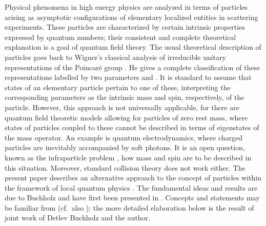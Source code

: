 \documentclass[a4paper,a4paper]{article}
\numberwithin{equation}{section}
\theoremstyle{definition}
\theoremstyle{plain}
\theoremstyle{remark}
\begin{document}
  Physical phenomena in high energy physics are analyzed in terms of
  particles arising as asymptotic configurations of elementary
  localized entities in scattering experiments. These particles are
  characterized by certain intrinsic properties expressed by quantum
  numbers; their consistent and complete theoretical explanation is a
  goal of quantum field theory. The usual theoretical description of
  particles goes back to Wigner's classical analysis of irreducible
  unitary representations of the Poincar\'e group \cite{wigner:1939}.
  He gives a complete classification of these representations labelled
  by two parameters \coordHE{} and \coordHE{}. It is standard to assume that states
  of an elementary particle pertain to one of these, interpreting the
  corresponding parameters as the intrinsic mass and spin,
  respectively, of the particle. However, this approach is not
  universally applicable, for there are quantum field theoretic models
  allowing for particles of zero rest mass, where states of particles
  coupled to these cannot be described in terms of eigenstates of the
  mass operator. An example is quantum electrodynamics, where charged
  particles are inevitably accompanied by soft photons. It is an open
  question, known as the infraparticle problem \cite{schroer:1963},
  how mass and spin are to be described in this situation. Moreover,
  standard collision theory does not work either. The present paper
  describes an alternative approach to the concept of particles within
  the framework of local quantum physics
  \cite{haag/kastler:1964,haag:1996}. The fundamental ideas and
  results are due to Buchholz and have first been presented in
  \cite{buchholz:1986b}. Concepts and statements may be familiar from
  \cite{buchholz/porrmann/stein:1991} (cf.~also
  \cite[Section~VI.2.2]{haag:1996}); the more detailed elaboration
  below is the result of joint work of Detlev Buchholz and the author.
  
\end{document}

